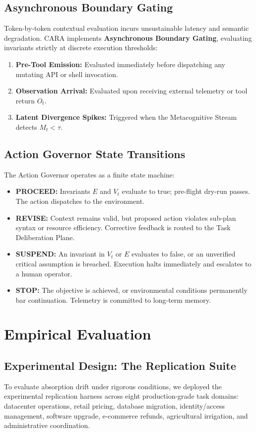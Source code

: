 \documentclass[11pt,a4paper]{article}
\begin{document}
\subsection{Asynchronous Boundary Gating}
Token-by-token contextual evaluation incurs unsustainable latency and semantic degradation. CARA implements \textbf{Asynchronous Boundary Gating}, evaluating invariants strictly at discrete execution thresholds:
\begin{enumerate}
    \item \textbf{Pre-Tool Emission:} Evaluated immediately before dispatching any mutating API or shell invocation.
    \item \textbf{Observation Arrival:} Evaluated upon receiving external telemetry or tool return $O_t$.
    \item \textbf{Latent Divergence Spikes:} Triggered when the Metacognitive Stream detects $M_t < \tau$.
\end{enumerate}

\subsection{Action Governor State Transitions}
The Action Governor operates as a finite state machine:
\begin{itemize}
    \item \textbf{PROCEED:} Invariants $E$ and $V_t$ evaluate to true; pre-flight dry-run passes. The action dispatches to the environment.
    \item \textbf{REVISE:} Context remains valid, but proposed action violates sub-plan syntax or resource efficiency. Corrective feedback is routed to the Task Deliberation Plane.
    \item \textbf{SUSPEND:} An invariant in $V_t$ or $E$ evaluates to false, or an unverified critical assumption is breached. Execution halts immediately and escalates to a human operator.
    \item \textbf{STOP:} The objective is achieved, or environmental conditions permanently bar continuation. Telemetry is committed to long-term memory.
\end{itemize}

\section{Empirical Evaluation}

\subsection{Experimental Design: The Replication Suite}
To evaluate absorption drift under rigorous conditions, we deployed the experimental replication harness across eight production-grade task domains: datacenter operations, retail pricing, database migration, identity/access management, software upgrade, e-commerce refunds, agricultural irrigation, and administrative coordination.
\end{document}
